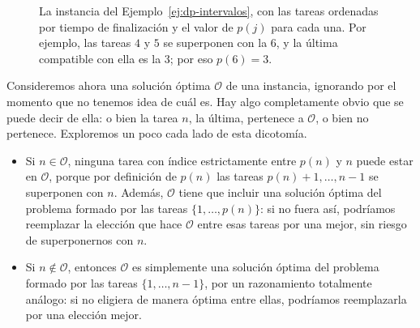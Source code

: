 \documentclass[12pt, spanish, oneside, openany]{book}
\theoremstyle{uprightplain}
\theoremstyle{definition}
\theoremstyle{remark}
\theoremstyle{definition}
\begin{document}
\begin{figure}[H]
\centering
{}
\caption{La instancia del Ejemplo~\ref{ej:dp-intervalos}, con las tareas
ordenadas por tiempo de finalización y el valor de $p(j)$ para cada una. Por
ejemplo, las tareas $4$ y $5$ se superponen con la $6$, y la última compatible
con ella es la $3$; por eso $p(6)=3$.}
\label{fig:dp-instancia-p}
\end{figure}

Consideremos ahora una solución óptima $\mathcal{O}$ de una instancia, ignorando por el momento que no tenemos idea de cuál es. Hay algo completamente obvio que se puede decir de ella: o bien la tarea $n$, la última, pertenece a $\mathcal{O}$, o bien no pertenece. Exploremos un poco cada lado de esta dicotomía.

\begin{itemize}
    \item Si $n\in\mathcal{O}$, ninguna tarea con índice estrictamente entre $p(n)$ y $n$ puede estar en $\mathcal{O}$, porque por definición de $p(n)$ las tareas $p(n)+1,\dots,n-1$ se superponen con $n$. Además, $\mathcal{O}$ tiene que incluir una solución óptima del problema formado por las tareas $\{1,\dots,p(n)\}$: si no fuera así, podríamos reemplazar la elección que hace $\mathcal{O}$ entre esas tareas por una mejor, sin riesgo de superponernos con $n$.

    \item Si $n\notin\mathcal{O}$, entonces $\mathcal{O}$ es simplemente una solución óptima del problema formado por las tareas $\{1,\dots,n-1\}$, por un razonamiento totalmente análogo: si no eligiera de manera óptima entre ellas, podríamos reemplazarla por una elección mejor.
\end{itemize}
\end{document}
